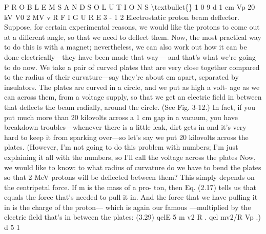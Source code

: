 \documentclass[10pt,oneside]{article}
\begin{document}
P R O B L E M S  A N D  S O L U T I O N S \textbackslash{}textbullet\{\} 1 0 9 d  1 cm Vp  20 kV V0  2 MV v R F I G U R E  3 - 1 2 Electrostatic proton beam deflector. Suppose, for certain experimental reasons, we would like the protons to come out at a different angle, so that we need to deflect them. Now, the most practical way to do this is with a magnet; nevertheless, we can also work out how it can be done electrically---they have been made that way--- and that’s what we’re going to do now. We take a pair of curved plates that are very close together compared to the radius of their curvature---say they’re about cm apart, separated by insulators. The plates are curved in a circle, and we put as high a volt- age as we can across them, from a voltage supply, so that we get an electric field in between that deflects the beam radially, around the circle. (See Fig. 3-12.) In fact, if you put much more than 20 kilovolts across a 1 cm gap in a vacuum, you have breakdown troubles---whenever there is a little leak, dirt gets in and it’s very hard to keep it from sparking over---so let’s say we put 20 kilovolts across the plates. (However, I’m not going to do this problem with numbers; I’m just explaining it all with the numbers, so I’ll call the voltage across the plates Now, we would like to know: to what radius of curvature do we have to bend the plates so that 2 MeV protons will be deflected between them? This simply depends on the centripetal force. If m is the mass of a pro- ton, then Eq. (2.17) tells us that equals the force that’s needed to pull it in. And the force that we have pulling it in is the charge of the proton--- which is again our famous ---multiplied by the electric field that’s in between the plates: (3.29) qelE 5 m v2 R . qel mv2/R Vp .) d 5 1\par
\end{document}
